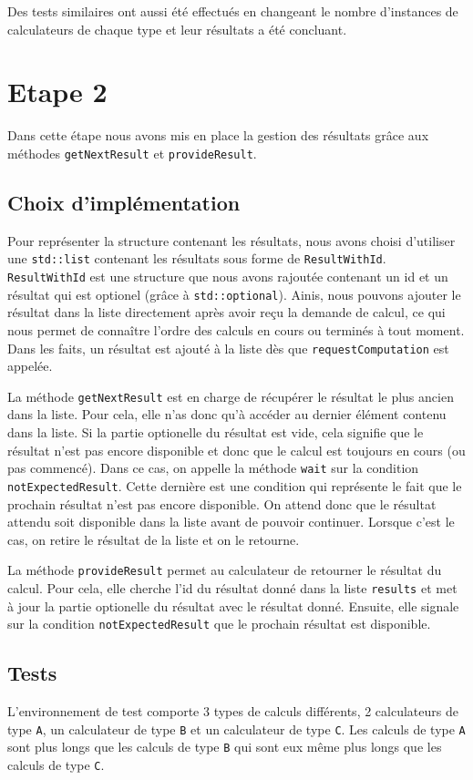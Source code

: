 \documentclass{article}
\begin{document}
Des tests similaires ont aussi été effectués en changeant le nombre d'instances de calculateurs de chaque type et leur
résultats a été concluant.

\section{Etape 2}
Dans cette étape nous avons mis en place la gestion des résultats grâce aux méthodes \texttt{getNextResult} et
\texttt{provideResult}.

\subsection{Choix d'implémentation}
Pour représenter la structure contenant les résultats, nous avons choisi d'utiliser une \texttt{std::list} contenant les
résultats sous forme de \texttt{ResultWithId}. \texttt{ResultWithId} est une structure que nous avons rajoutée
contenant un id et un résultat qui est optionel (grâce à \texttt{std::optional}). Ainis, nous pouvons ajouter le
résultat dans la liste directement après avoir reçu la demande de calcul, ce qui nous permet de connaître l'ordre des
calculs en cours ou terminés à tout moment. Dans les
faits, un résultat est ajouté à la liste dès que \texttt{requestComputation} est appelée.

La méthode \texttt{getNextResult} est en charge de récupérer le résultat le plus ancien dans la liste. Pour cela, elle
n'as donc qu'à accéder au dernier élément contenu dans la liste. Si la partie optionelle du résultat est vide, cela
signifie que le résultat n'est pas encore disponible et donc que le calcul est toujours en cours (ou pas commencé).
Dans ce
cas, on
appelle la méthode \texttt{wait} sur la condition \texttt{notExpectedResult}. Cette dernière est une condition qui
représente le fait que le prochain résultat n'est pas encore disponible. On attend donc que le résultat attendu
soit disponible dans la liste avant de pouvoir continuer. Lorsque c'est le cas, on retire le résultat de la liste et
on le retourne.

La méthode \texttt{provideResult} permet au calculateur de retourner le résultat du calcul. Pour cela, elle cherche
l'id du résultat donné dans la liste \texttt{results} et met à jour la partie optionelle du résultat avec le résultat
donné. Ensuite, elle signale sur la condition \texttt{notExpectedResult} que le prochain résultat est disponible.


\subsection{Tests}
L'environnement de test comporte 3 types de calculs différents, 2 calculateurs de type \texttt{A}, un
calculateur de type \texttt{B} et un calculateur de type \texttt{C}. Les calculs de type \texttt{A} sont plus longs
que les calculs de type \texttt{B} qui sont eux même plus longs que les calculs de type \texttt{C}.
\end{document}
